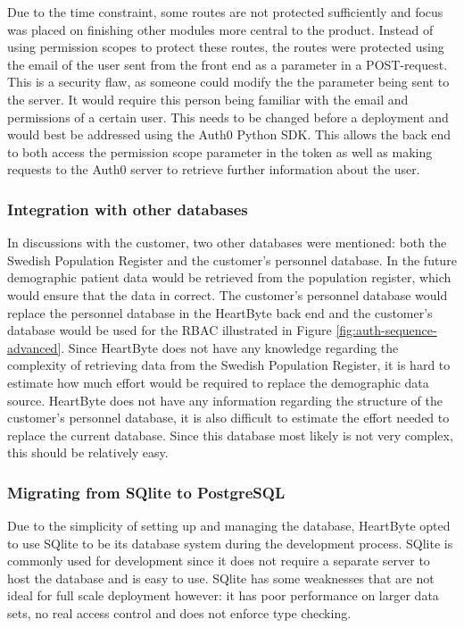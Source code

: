 \documentclass{article}
\begin{document}
Due to the time constraint, some routes are not protected sufficiently and focus was placed on finishing other modules more central to the product. Instead of using permission scopes to protect these routes, the routes were protected using the email of the user sent from the front end as a parameter in a POST-request. This is a security flaw, as someone could modify the the parameter being sent to the server. It would require this person being familiar with the email and permissions of a certain user. This needs to be changed before a deployment and would best be addressed using the Auth0 Python SDK. This allows the back end to both access the permission scope parameter in the token as well as making requests to the Auth0 server to retrieve further information about the user.

\subsubsection{Integration with other databases}
In discussions with the customer, two other databases were mentioned: both the Swedish Population Register and the customer's personnel database. In the future demographic patient data would be retrieved from the population register, which would ensure that the data in correct. The customer's personnel database would replace the personnel database in the HeartByte back end and the customer's database would be used for the RBAC illustrated in Figure \ref{fig:auth-sequence-advanced}.
Since HeartByte does not have any knowledge regarding the complexity of retrieving data from the Swedish Population Register, it is hard to estimate how much effort would be required to replace the demographic data source. HeartByte does not have any information regarding the structure of the customer's personnel database, it is also difficult to estimate the effort needed to replace the current database. Since this database most likely is not very complex, this should be relatively easy.


\subsubsection{Migrating from SQlite to PostgreSQL}
Due to the simplicity of setting up and managing the database, HeartByte opted to use SQlite to be its database system during the development process. SQlite is commonly used for development since it does not require a separate server to host the database and is easy to use. SQlite has some weaknesses that are not ideal for full scale deployment however: it has poor performance on larger data sets, no real access control and does not enforce type checking. 
\end{document}
